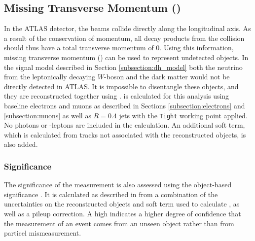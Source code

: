 \subsection{Missing Transverse Momentum (\met)}
In the ATLAS detector, the beams collide directly along the longitudinal axis. As a result of the conservation of momentum, all decay products from the collision should thus have a total transverse momentum of 0. Using this information, missing transverse momentum (\met) can be used to represent undetected objects. In the signal model described in Section \ref{subsection:dh_model} both the neutrino from the leptonically decaying $W$-boson and the dark matter would not be directly detected in ATLAS. It is impossible to disentangle these objects, and they are reconstructed together using \met. \met is calculated for this analysis using baseline electrons and muons as described in Sections \ref{subsection:electrons} and \ref{subsection:muons} as well as $R=0.4$ jets with the \verb|Tight| working point applied. No photons or \tau-leptons are included in the calculation. An additional soft term, which is calculated from tracks not associated with the reconstructed objects, is also added.

\subsubsection{\met Significance}
The significance of the \met measurement is also assessed using the object-based \met significance \metsig. It is calculated as described in \cite{MetSig} from a combination of the uncertainties on the reconstructed objects and soft term used to calculate \met, as well as a pileup correction. A high \metsig indicates a higher degree of confidence that the \met measurement of an event comes from an unseen object rather than from particel mismeasurement.
